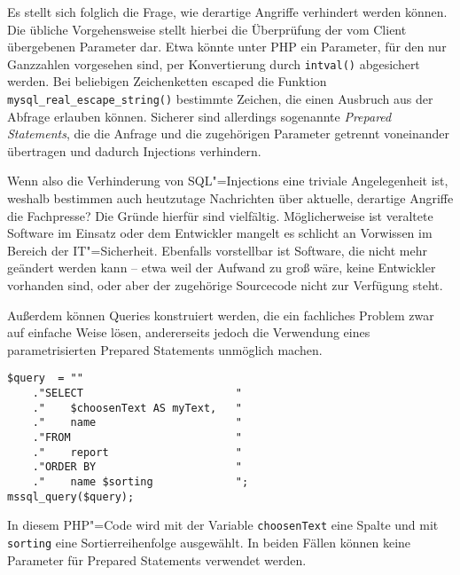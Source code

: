 Es stellt sich folglich die Frage, wie derartige Angriffe verhindert werden können. Die übliche Vorgehensweise stellt hierbei die Überprüfung der vom Client übergebenen Parameter dar. Etwa könnte unter PHP ein Parameter, für den nur Ganzzahlen vorgesehen sind, per Konvertierung durch \texttt{intval()} abgesichert werden.  Bei beliebigen Zeichenketten escaped die Funktion \texttt{mysql_real_escape_string()} bestimmte Zeichen, die einen Ausbruch aus der Abfrage erlauben können. Sicherer sind allerdings sogenannte \emph{Prepared Statements}, die die Anfrage und die zugehörigen Parameter getrennt voneinander übertragen und dadurch Injections verhindern.

Wenn also die Verhinderung von SQL"=Injections eine triviale Angelegenheit ist, weshalb bestimmen auch heutzutage Nachrichten über aktuelle, derartige Angriffe die Fachpresse? Die Gründe hierfür sind vielfältig. Möglicherweise ist veraltete Software im Einsatz oder dem Entwickler mangelt es schlicht an Vorwissen im Bereich der IT"=Sicherheit.
Ebenfalls vorstellbar ist Software, die nicht mehr geändert werden kann -- etwa weil der Aufwand zu groß wäre, keine Entwickler vorhanden sind, oder aber der zugehörige Sourcecode nicht zur Verfügung steht.

Außerdem können Queries konstruiert werden, die ein fachliches Problem zwar auf einfache Weise lösen, andererseits jedoch die Verwendung eines parametrisierten Prepared Statements unmöglich machen.

\begin{listing}[ht!]
\begin{margincap}
\begin{verbatim}
$query  = ""
    ."SELECT                        "
    ."    $choosenText AS myText,   "
    ."    name                      "
    ."FROM                          "
    ."    report                    "
    ."ORDER BY                      "
    ."    name $sorting             ";
mssql_query($query);
\end{verbatim}
\caption{In diesem PHP"=Code wird mit der Variable \texttt{choosenText} eine Spalte und mit \texttt{sorting} eine Sortierreihenfolge ausgewählt. In beiden Fällen können keine Parameter für Prepared Statements verwendet werden.}
\label{lst:strange_query}
\end{margincap}
\end{listing}

